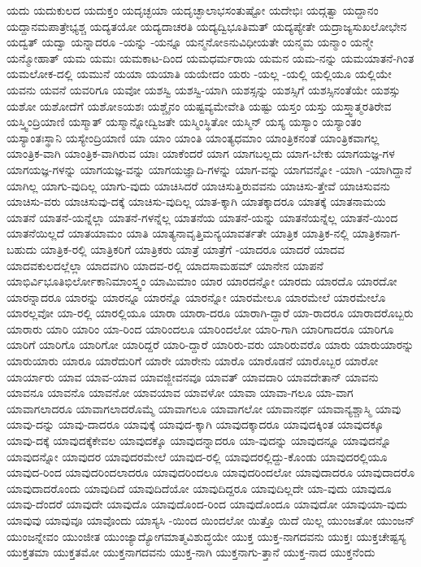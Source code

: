{ಯದು
ಯದುಕುಲದ
ಯದುಕ್ತಂ
ಯದೃಚ್ಛಯಾ
ಯದೃಚ್ಛಾಲಾಭಸಂತುಷ್ಟೋ
ಯದೇಭಿಃ
ಯದ್ಗತ್ವಾ
ಯದ್ದಾನಂ
ಯದ್ದಾನಮಪಾತ್ರೇಭ್ಯಶ್ಚ
ಯದ್ಯತಯೋ
ಯದ್ಯದಾಚರತಿ
ಯದ್ಯದ್ವಿಭೂತಿಮತ್
ಯದ್ಯಪ್ಯೇತೇ
ಯದ್ರಾಜ್ಯಸುಖಲೋಭೇನ
ಯದ್ವತ್
ಯದ್ವಾ
ಯನ್ನಾದರೂ
-ಯನ್ನು
-ಯನ್ನೂ
ಯನ್ಮನೋಽನುವಿಧೀಯತೇ
ಯನ್ಮಮ
ಯನ್ಮಾಂ
ಯನ್ಮೇ
ಯನ್ಮೋಹಾತ್
ಯಮ
ಯಮಃ
ಯಮಕಾಟ-ದಿಂದ
ಯಮಧರ್ಮರಾಯ
ಯಮನ
ಯಮ-ನನ್ನು
ಯಮಯಾತನೆ-ಗಿಂತ
ಯಮಲೋಕ-ದಲ್ಲಿ
ಯಮುನೆ
ಯಯಾ
ಯಯಾತಿ
ಯಯೇದಂ
ಯರು
-ಯಲ್ಲ
-ಯಲ್ಲಿ
ಯಲ್ಲಿಯೂ
ಯಲ್ಲಿಯೇ
ಯವನು
ಯವನೆ
ಯವರಿಗೂ
ಯವೋ
ಯಶಸ್ವಿ
ಯಶಸ್ವಿ-ಯಾಗಿ
ಯಶಸ್ಸನ್ನು
ಯಶಸ್ಸಿಗೆ
ಯಶಸ್ಸಿನಂತೆಯೇ
ಯಶಸ್ಸು
ಯಶೋ
ಯಶೋದೆಗೆ
ಯಶೋಽಯಶಃ
ಯಶ್ಚೈನಂ
ಯಷ್ಟವ್ಯಮೇವೇತಿ
ಯಷ್ಟು
ಯಸ್ತಂ
ಯಸ್ತು
ಯಸ್ತ್ವಾತ್ಮರತಿರೇವ
ಯಸ್ತ್ವಿಂದ್ರಿಯಾಣಿ
ಯಸ್ಮಾತ್
ಯಸ್ಮಾನ್ನೋದ್ವಿಜತೇ
ಯಸ್ಮಿಂಸ್ಥಿತೋ
ಯಸ್ಮಿನ್
ಯಸ್ಯ
ಯಸ್ಯಾಂ
ಯಸ್ಯಾಂತಂ
ಯಸ್ಯಾಂತಃಸ್ಥಾನಿ
ಯಸ್ಯೇಂದ್ರಿಯಾಣಿ
ಯಾ
ಯಾಂ
ಯಾಂತಿ
ಯಾಂತ್ಯಧಮಾಂ
ಯಾಂತ್ರಿಕನಂತೆ
ಯಾಂತ್ರಿಕವಾಗಲ್ಲ
ಯಾಂತ್ರಿಕ-ವಾಗಿ
ಯಾಂತ್ರಿಕ-ವಾಗಿರುವ
ಯಾಃ
ಯಾಕೆಂದರೆ
ಯಾಗ
ಯಾಗಬಲ್ಲದು
ಯಾಗ-ಬೇಕು
ಯಾಗಯಜ್ಞ-ಗಳ
ಯಾಗಯಜ್ಞ-ಗಳನ್ನು
ಯಾಗಯಜ್ಞ-ವನ್ನು
ಯಾಗಯಜ್ಞಾದಿ-ಗಳನ್ನು
ಯಾಗ-ವನ್ನು
ಯಾಗವನ್ನೋ
-ಯಾಗಿ
-ಯಾಗಿದ್ದಾನೆ
ಯಾಗಿಲ್ಲ
ಯಾಗು-ವುದಿಲ್ಲ
ಯಾಗು-ವುದು
ಯಾಚಿಸಿದರೆ
ಯಾಚಿಸುತ್ತಿರುವವನು
ಯಾಚಿಸು-ತ್ತೇವೆ
ಯಾಚಿಸುವನು
ಯಾಚಿಸು-ವರು
ಯಾಚಿಸುವು-ದಕ್ಕೆ
ಯಾಚಿಸು-ವುದಿಲ್ಲ
ಯಾತ-ಕ್ಕಾಗಿ
ಯಾತಕ್ಕಾದರೂ
ಯಾತಕ್ಕೆ
ಯಾತನಾಮಯ
ಯಾತನೆ
ಯಾತನೆ-ಯನ್ನೆಲ್ಲಾ
ಯಾತನೆ-ಗಳನ್ನೆಲ್ಲ
ಯಾತನೆಯ
ಯಾತನೆ-ಯನ್ನು
ಯಾತನೆಯನ್ನೆಲ್ಲ
ಯಾತನೆ-ಯಿಂದ
ಯಾತನೆಯಿಲ್ಲದೆ
ಯಾತಯಾಮಂ
ಯಾತಿ
ಯಾತ್ಯನಾವೃತ್ತಿಮನ್ಯಯಾವರ್ತತೇ
ಯಾತ್ರಿಕ
ಯಾತ್ರಿಕ-ನಲ್ಲಿ
ಯಾತ್ರಿಕನಾಗ-ಬಹುದು
ಯಾತ್ರಿಕ-ರಲ್ಲಿ
ಯಾತ್ರಿಕರಿಗೆ
ಯಾತ್ರಿಕರು
ಯಾತ್ರೆ
ಯಾತ್ರೆಗೆ
-ಯಾದರೂ
ಯಾದರೆ
ಯಾದವ
ಯಾದವಕುಲದಲ್ಲೆಲ್ಲಾ
ಯಾದವಗಿರಿ
ಯಾದವ-ರಲ್ಲಿ
ಯಾದಸಾಮಹಮ್
ಯಾನೇನ
ಯಾಪನೆ
ಯಾಭಿರ್ವಿಭೂತಿಭಿರ್ಲೋಕಾನಿಮಾಂಸ್ತ್ವಂ
ಯಾಮಿಮಾಂ
ಯಾರ
ಯಾರದನ್ನೋ
ಯಾರದು
ಯಾರದೊ
ಯಾರದೋ
ಯಾರನ್ನಾದರೂ
ಯಾರನ್ನು
ಯಾರನ್ನೂ
ಯಾರನ್ನೊ
ಯಾರನ್ನೋ
ಯಾರಮೇಲೂ
ಯಾರಮೇಲೆ
ಯಾರಮೇಲೊ
ಯಾರಲ್ಲವೋ
ಯಾ-ರಲ್ಲಿ
ಯಾರಲ್ಲಿಯೂ
ಯಾರಾ
ಯಾರಾ-ದರೂ
ಯಾರಾಗಿ-ದ್ದಾರೆ
ಯಾ-ರಾದರೂ
ಯಾರಾದರೊಬ್ಬರು
ಯಾರಾರು
ಯಾರಿ
ಯಾರಿಂ
ಯಾ-ರಿಂದ
ಯಾರಿಂದಲೂ
ಯಾರಿಂದಲೋ
ಯಾರಿ-ಗಾಗಿ
ಯಾರಿಗಾದರೂ
ಯಾರಿಗೂ
ಯಾರಿಗೆ
ಯಾರಿಗೊ
ಯಾರಿಗೋ
ಯಾರಿದ್ದರೆ
ಯಾರಿ-ದ್ದಾರೆ
ಯಾರಿರು-ವರು
ಯಾರಿರುವರೊ
ಯಾರು
ಯಾರುಯಾರನ್ನು
ಯಾರುಯಾರು
ಯಾರೂ
ಯಾರೆದುರಿಗೆ
ಯಾರೇ
ಯಾರೇನು
ಯಾರೊ
ಯಾರೊಡನೆ
ಯಾರೊಬ್ಬರ
ಯಾರೋ
ಯಾರ್ಯಾರು
ಯಾವ
ಯಾವ-ಯಾವ
ಯಾವಜ್ಜೀವನವೂ
ಯಾವತ್
ಯಾವದಾರಿ
ಯಾವದೇತಾನ್
ಯಾವನು
ಯಾವನೂ
ಯಾವನೊ
ಯಾವನೋ
ಯಾವಯಾವ
ಯಾವಳೋ
ಯಾವಾ
ಯಾವಾ-ಗಲೂ
ಯಾ-ವಾಗ
ಯಾವಾಗಲಾದರೂ
ಯಾವಾಗಲಾದರೊಮ್ಮೆ
ಯಾವಾಗಲೂ
ಯಾವಾಗಲೋ
ಯಾವಾನರ್ಥ
ಯಾವಾನ್ಯಶ್ಚಾಸ್ಮಿ
ಯಾವು
ಯಾವು-ದನ್ನು
ಯಾವು-ದಾದರೂ
ಯಾವುಕ್ಕೆ
ಯಾವುದ-ಕ್ಕಾಗಿ
ಯಾವುದಕ್ಕಾದರೂ
ಯಾವುದಕ್ಕಿಂತ
ಯಾವುದಕ್ಕೂ
ಯಾವು-ದಕ್ಕೆ
ಯಾವುದಕ್ಕೆಕೇವಲ
ಯಾವುದಕ್ಕೊ
ಯಾವುದನ್ನಾದರೂ
ಯಾ-ವುದನ್ನು
ಯಾವುದನ್ನೂ
ಯಾವುದನ್ನೊ
ಯಾವುದನ್ನೋ
ಯಾವುದರ
ಯಾವುದರಮೇಲೆ
ಯಾವುದ-ರಲ್ಲಿ
ಯಾವುದರಲ್ಲಿದ್ದು-ಕೊಂಡು
ಯಾವುದರಲ್ಲಿಯೂ
ಯಾವುದ-ರಿಂದ
ಯಾವುದರಿಂದಲಾದರೂ
ಯಾವುದರಿಂದಲೂ
ಯಾವುದರಿಂದಲೋ
ಯಾವುದಾದರೂ
ಯಾವುದಾದರೊ
ಯಾವುದಾದರೊಂದು
ಯಾವುದಿದೆ
ಯಾವುದಿದೆಯೋ
ಯಾವುದಿದ್ದರೂ
ಯಾವುದಿಲ್ಲದೇ
ಯಾ-ವುದು
ಯಾವುದೂ
ಯಾವು-ದೆಂದರೆ
ಯಾವುದೇ
ಯಾವುದೊ
ಯಾವುದೊಂದ-ರಿಂದ
ಯಾವುದೊಂದೂ
ಯಾವುದೋ
ಯಾವುಯಾ-ವುದು
ಯಾವುವು
ಯಾವುವೂ
ಯಾವೊಂದು
ಯಾಸ್ಯಸಿ
-ಯಿಂದ
ಯಿಂದಲೋ
ಯಿತ್ತೊ
ಯಿದೆ
ಯಿಲ್ಲ
ಯುಂಜತೋ
ಯುಂಜನ್
ಯುಂಜನ್ನೇವಂ
ಯುಂಜೀತ
ಯುಂಜ್ಯಾದ್ಯೋಗಮಾತ್ಮವಿಶುದ್ಧಯೇ
ಯುಕ್ತ
ಯುಕ್ತ-ನಾಗದವನು
ಯುಕ್ತಃ
ಯುಕ್ತಚೇಷ್ಟಸ್ಯ
ಯುಕ್ತತಮಾ
ಯುಕ್ತತಮೋ
ಯುಕ್ತನಾಗದವನು
ಯುಕ್ತ-ನಾಗಿ
ಯುಕ್ತನಾಗು-ತ್ತಾನೆ
ಯುಕ್ತ-ನಾದ
ಯುಕ್ತನೆಂದು
}
